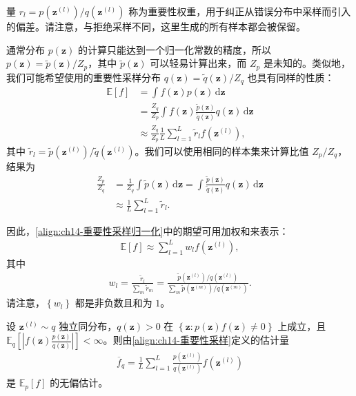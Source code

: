 \documentclass[../../main.tex]{subfiles}
\begin{document}
量 $r_{l}=p\!\left(\bm{z}^{(l)}\right)/q\!\left(\bm{z}^{(l)}\right)$ 称为重要性权重，用于纠正从错误分布中采样而引入的偏差。请注意，与拒绝采样不同，这里生成的所有样本都会被保留。

通常分布 $p(\bm{z})$ 的计算只能达到一个归一化常数的精度，所以 $p(\bm{z})=\widetilde{p}(\bm{z})/Z_{p}$，其中 $\widetilde{p}(\bm{z})$ 可以轻易计算出来，而 $Z_{p}$ 是未知的。类似地，我们可能希望使用的重要性采样分布 $q(\bm{z})=\widetilde{q}(\bm{z})/Z_{q}$ 也具有同样的性质：
\begin{align}
\mathbb{E}[f]&=\int f(\bm{z})p(\bm{z})\,\mathrm{d}\bm{z}\nonumber\\
&=\frac{Z_{q}}{Z_{p}}\int f(\bm{z})\frac{\widetilde{p}(\bm{z})}{\widetilde{q}(\bm{z})}q(\bm{z})\,\mathrm{d}\bm{z}\nonumber\\
&\approx\frac{Z_{q}}{Z_{p}}\frac{1}{L}\sum_{l=1}^{L}\tilde{r}_{l}f\!\left(\bm{z}^{(l)}\right),
\label{align:ch14-重要性采样归一化}
\end{align}
其中 $\tilde{r}_{l}=\widetilde{p}\!\left(\bm{z}^{(l)}\right)/\widetilde{q}\!\left(\bm{z}^{(l)}\right)$。我们可以使用相同的样本集来计算比值 $Z_{p}/Z_{q}$，结果为
\begin{align}
\frac{Z_{p}}{Z_{q}}&=\frac{1}{Z_{q}}\int\widetilde{p}(\bm{z})\,\mathrm{d}\bm{z}=\int\frac{\widetilde{p}(\bm{z})}{\widetilde{q}(\bm{z})}q(\bm{z})\,\mathrm{d}\bm{z}\nonumber\\
&\approx\frac{1}{L}\sum_{l=1}^{L}\tilde{r}_{l}.
\label{align:ch14-归一化常数比}
\end{align}

因此，\eqref{align:ch14-重要性采样归一化}中的期望可用加权和来表示：
\begin{align}
\mathbb{E}[f]\approx\sum_{l=1}^{L}w_{l}f\!\left(\bm{z}^{(l)}\right),
\label{align:ch14-加权和}
\end{align}
其中
\begin{align}
w_{l}=\frac{\tilde{r}_{l}}{\sum_{m}\tilde{r}_{m}}=\frac{\widetilde{p}\!\left(\bm{z}^{(l)}\right)/q\!\left(\bm{z}^{(l)}\right)}{\sum_{m}\widetilde{p}\!\left(\bm{z}^{(m)}\right)/q\!\left(\bm{z}^{(m)}\right)}.
\label{align:ch14-归一化权重}
\end{align}
请注意，$\left\{w_{l}\right\}$ 都是非负数且和为 $1$。

\begin{proposition}[重要性采样估计的无偏性]\label{proposition:ch14-重要性采样无偏}
设 $\bm{z}^{(l)}\sim q$ 独立同分布，$q(\bm{z})>0$ 在 $\left\{\bm{z}:p(\bm{z})f(\bm{z})\neq0\right\}$ 上成立，且 $\mathbb{E}_{q}\left[\left|f(\bm{z})\frac{p(\bm{z})}{q(\bm{z})}\right|\right]<\infty$。则由\eqref{align:ch14-重要性采样}定义的估计量
\begin{align*}
\overline{f}_{q}=\frac{1}{L}\sum_{l=1}^{L}\frac{p\!\left(\bm{z}^{(l)}\right)}{q\!\left(\bm{z}^{(l)}\right)}f\!\left(\bm{z}^{(l)}\right)
\end{align*}
是 $\mathbb{E}_{p}[f]$ 的无偏估计。
\end{proposition}
\end{document}
